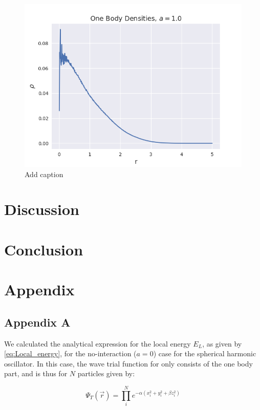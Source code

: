 \documentclass[norsk,a4paper,12pt]{article}
\begin{document}
\begin{figure} [H]
    \centering
    \includegraphics[scale=0.65]{images/ob_a_1.png}
    \caption{Add caption}
    \label{fig:ob1}
\end{figure} 

\section{Discussion}



\section{Conclusion}

\section{Appendix}
\subsection{Appendix A}
\label{appendix_A}

We calculated the analytical expression for the local energy $E_L$, as given by \ref{eq:Local_energy}, for the no-interaction ($a=0$) case for the spherical harmonic oscillator. In this case, the wave trial function for only consists of the one body part, and is thus for $N$ particles given by:

\begin{equation}
	\label{eq:WF_nointeract}
	\Psi_T(\vec{r}) = \prod_i^N e^{-\alpha(x_i^2 + y_i^2 + \beta z_i^2)}
\end{equation}
\end{document}
